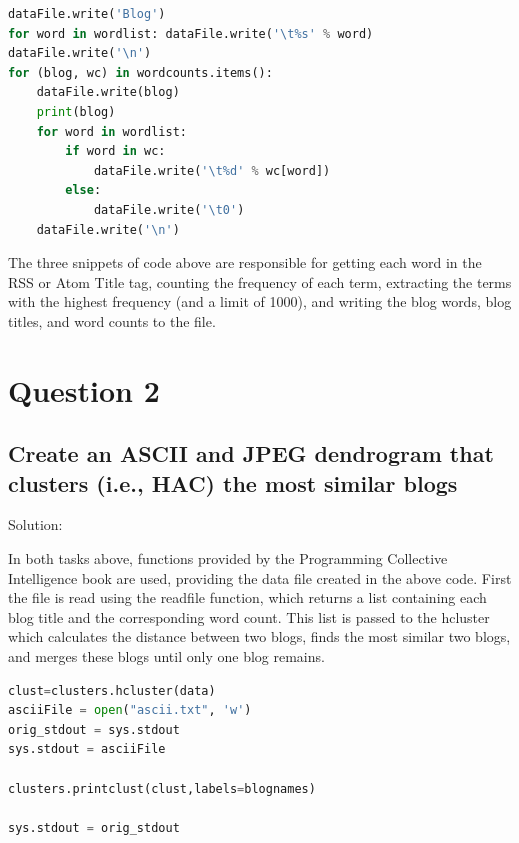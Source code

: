 \documentclass[11pt]{scrartcl} %
\begin{document}
\begin{lstlisting}[language = Python, caption=Write File]
dataFile.write('Blog')
for word in wordlist: dataFile.write('\t%s' % word)
dataFile.write('\n')
for (blog, wc) in wordcounts.items():
    dataFile.write(blog)
    print(blog)
    for word in wordlist:
        if word in wc:
            dataFile.write('\t%d' % wc[word])
        else:
            dataFile.write('\t0')
    dataFile.write('\n')
\end{lstlisting} \bigskip 

\tabto{2.0cm} The three snippets of code above are responsible for getting each word in the RSS or Atom Title tag, counting the frequency of each term, extracting the terms with the highest frequency (and a limit of 1000), and writing the blog words, blog titles, and word counts to the file. 

\pagebreak

\section*{Question 2}


\subsection*{Create an ASCII and JPEG dendrogram that clusters (i.e., HAC)
the most similar blogs}

\bigskip\bigskip
\LARGE Solution: \newline\newline\small

\tabto{2.0 cm} In both tasks above, functions provided by the Programming Collective Intelligence book are used, providing the data file created in the above code. First the file is read using the readfile function, which returns a list containing each blog title and the corresponding word count.  This list is passed to the hcluster which calculates the distance between two blogs, finds the most similar two blogs, and merges these blogs until only one blog remains. 

\begin{lstlisting}[language = Python, caption=ASCII File Generation]
clust=clusters.hcluster(data)
asciiFile = open("ascii.txt", 'w') 
orig_stdout = sys.stdout
sys.stdout = asciiFile

clusters.printclust(clust,labels=blognames)

sys.stdout = orig_stdout
\end{lstlisting} \bigskip 
\end{document}
